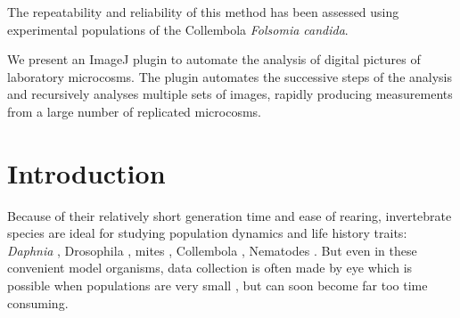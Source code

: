 The repeatability and reliability of this method has been assessed using
experimental populations of the Collembola \textit{Folsomia candida}.

We present an ImageJ plugin to automate the analysis of digital pictures of
laboratory microcosms. The plugin automates the successive steps of the analysis
and recursively analyses multiple sets of images, rapidly producing measurements
from a large number of replicated microcosms.

\section{Introduction}

Because of their relatively short generation time and ease of rearing,
invertebrate species are ideal for studying population dynamics and life history
traits: \textit{Daphnia} \autocite{drake2009a,hebert1978a}, Drosophila
\autocite{mueller2005a}, mites \autocite{benton2005a}, Collembola
\autocite{tully2008a,pike2004a}, Nematodes \autocite{alvarez2005a,chen2001a}.
But even in these convenient model organisms, data collection is often made by
eye which is possible when populations are very small
\autocite{pike2004a,drake2004a}, but can soon become far too time consuming.

